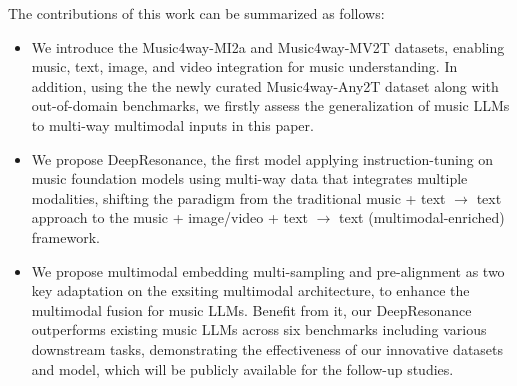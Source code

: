 The contributions of this work can be summarized as follows:
\begin{itemize}
    \item We introduce the Music4way-MI2a and Music4way-MV2T datasets, enabling music, text, image, and video integration for music understanding. In addition, using the the newly curated Music4way-Any2T dataset along with out-of-domain benchmarks, we firstly assess the generalization of music LLMs to multi-way multimodal inputs in this paper. 
    \item We propose DeepResonance, the first model applying instruction-tuning on music foundation models using multi-way data that integrates multiple modalities, shifting the paradigm from the traditional music + text $\xrightarrow{}$ text approach to the music + image/video + text $\xrightarrow{}$ text (multimodal-enriched) framework.
    \item We propose multimodal embedding multi-sampling and pre-alignment as two key adaptation on the exsiting multimodal architecture, to enhance the multimodal fusion for music LLMs. Benefit from it, our DeepResonance outperforms existing music LLMs across six benchmarks including various downstream tasks, demonstrating the effectiveness of our innovative datasets and model, which will be publicly available for the follow-up studies.
\end{itemize}

